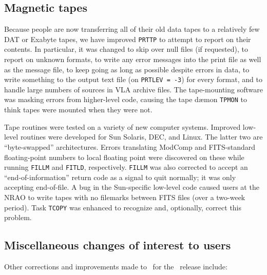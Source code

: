 \subsection{Magnetic tapes}

Because people are now transferring all of their old data tapes to a
relatively few DAT or Exabyte tapes, we have improved {\tt PRTTP} to
attempt to report on their contents.  In particular, it was changed to
skip over null files (if requested), to report on unknown formats, to
write any error messages into the print file as well as the message
file, to keep going as long as possible despite errors in data, to
write something to the output text file (on {\tt PRTLEV = -3}) for
every format, and to handle large numbers of sources in VLA archive
files.  The tape-mounting software was masking errors from
higher-level code, causing the tape d\ae mon {\tt TPMON} to think
tapes were mounted when they were not.

Tape routines were tested on a variety of new computer systems.
Improved low-level routines were developed for Sun Solaris, DEC, and
Linux.  The latter two are ``byte-swapped'' architectures.  Errors
translating ModComp and FITS-standard floating-point numbers to local
floating point were discovered on these while running {\tt FILLM} and
{\tt FITLD}, respectively.  {\tt FILLM} was also corrected to accept
an ``end-of-information'' return code as a signal to quit normally; it
was only accepting end-of-file.  A bug in the Sun-specific low-level
code caused users at the NRAO to write tapes with no filemarks between
FITS files (over a two-week period).  Task {\tt TCOPY} was enhanced to
recognize and, optionally, correct this problem.

\subsection{Miscellaneous changes of interest to users}

Other corrections and improvements made to \AIPS\ for the
\RELEASENAME\ release include:
\vspace{-10pt}

